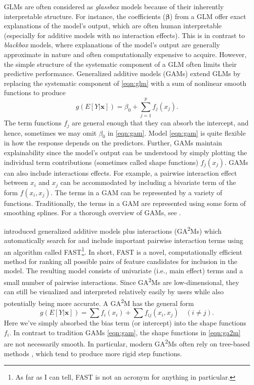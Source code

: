 GLMs are often considered as \emph{glassbox} models because of their
inherently interpretable structure. For instance, the coefficients
(\(\boldsymbol{\beta}\)) from a GLM offer exact explanations of the
model's output, which are often human interpretable (especially for
additive models with no interaction effects). This is in contrast to
\emph{blackbox} models, where explanations of the model's output are
generally approximate in nature and often computationally expensive to
acquire. However, the simple structure of the systematic component of a
GLM often limits their predictive performance. Generalized additive
models (GAMs) \citep{hastie-1990-gam} extend GLMs by replacing the
systematic component of \eqref{eqn:glm} with a sum of nonlinear smooth
functions to produce \begin{equation}
  g\left(E\left[Y|\boldsymbol{x}\right]\right) = \beta_0 + \sum_{j=1}^p f_j\left(x_j\right).
  \label{eqn:gam}
\end{equation} The term functions \(f_j\) are general enough that they
can absorb the intercept, and hence, sometimes we may omit \(\beta_0\)
in \eqref{eqn:gam}. Model \eqref{eqn:gam} is quite flexible in how the
response depends on the predictors. Further, GAMs maintain
explainability since the model's output can be understood by simply
plotting the individual term contributions (sometimes called shape
functions) \(f_j\left(x_j\right)\). GAMs can also include interactions
effects. For example, a pairwise interaction effect between \(x_i\) and
\(x_j\) can be accommodated by including a bivariate term of the form
\(f\left(x_i, x_j\right)\). The terms in a GAM can be represented by a
variety of functions. Traditionally, the terms in a GAM are represented
using some form of smoothing splines. For a thorough overview of GAMs,
see \citet{wood-2017-gam}.

\citet{lou-2013-ga2m} introduced generalized additive models plus
interactions (GA\textsuperscript{2}Ms) which automatically search for
and include important pairwise interaction terms using an algorithm
called FAST\footnote{As far as I can tell, FAST is not an acronym for
  anything in particular.}. In short, FAST is a novel, computationally
efficient method for ranking all possible pairs of feature candidates
for inclusion in the model. The resulting model consists of univariate
(i.e., main effect) terms and a small number of pairwise interactions.
Since GA\textsuperscript{2}Ms are low-dimensional, they can still be
visualized and interpreted relatively easily by users while also
potentially being more accurate. A GA\textsuperscript{2}M has the
general form \begin{equation}
  g\left(E\left[Y|\boldsymbol{x}\right]\right) = \sum f_i\left(x_i\right) + \sum f_{ij}\left(x_i, x_j\right) \quad \left(i \ne j\right).
  \label{eqn:ga2m}
\end{equation} Here we've simply absorbed the bias term (or intercept)
into the shape functions \(f_i\). In contrast to tradition GAMs
\eqref{eqn:gam}, the shape functions in \eqref{eqn:ga2m} are not
necessarily smooth. In particular, modern GA\textsuperscript{2}Ms often
rely on tree-based methods \citep{greenwell-2022-tree}, which tend to
produce more rigid step functions.

